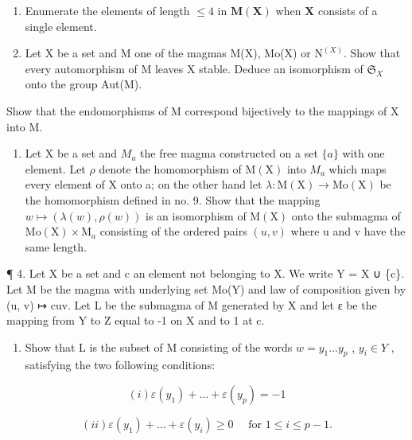 \BourbakiExercisesSection

\begin{enumerate}
\def\labelenumi{\arabic{enumi}.}
\item
  Enumerate the elements of length \(\leqslant 4\) in \(\mathbf{M}(\mathbf{X})\) when \(\mathbf{X}\) consists of a single element.
\item
  Let X be a set and M one of the magmas M(X), Mo(X) or \(\mathrm{N}^{(X)}\). Show that every automorphism of M leaves X stable. Deduce an isomorphism of \(\mathfrak{S}_{X}\) onto the group Aut(M).
\end{enumerate}

Show that the endomorphisms of M correspond bijectively to the mappings of X into M.

\begin{enumerate}
\def\labelenumi{\arabic{enumi}.}
\setcounter{enumi}{2}
\tightlist
\item
  Let X be a set and \(M_{a}\) the free magma constructed on a set \(\{a\}\) with one element. Let \(\rho\) denote the homomorphism of \(\mathrm{M}(\mathrm{X})\) into \(M_{a}\) which maps every element of X onto a; on the other hand let \(\lambda: \mathrm{M}(\mathrm{X}) \to \mathrm{Mo}(\mathrm{X})\) be the homomorphism defined in no. 9. Show that the mapping \(w \mapsto (\lambda(w), \rho(w))\) is an isomorphism of \(\mathrm{M}(\mathrm{X})\) onto the submagma of \(\mathrm{Mo}(\mathrm{X}) \times \mathrm{M}_{a}\) consisting of the ordered pairs \((u, v)\) where u and v have the same length.
\end{enumerate}

¶ 4. Let X be a set and c an element not belonging to X. We write Y = X ∪ \{c\}. Let M be the magma with underlying set Mo(Y) and law of composition given by (u, v) ↦ cuv. Let L be the submagma of M generated by X and let ε be the mapping from Y to Z equal to -1 on X and to 1 at c.

\begin{enumerate}
\def\labelenumi{(\alph{enumi})}
\tightlist
\item
  Show that L is the subset of M consisting of the words \(w = y_{1} \ldots y_{p}\) , \(y_{i} \in Y\) , satisfying the two following conditions:
\end{enumerate}

\[
(i) \varepsilon (y _ {1}) + \dots + \varepsilon (y _ {p}) = - 1
\]

\[
(ii) \varepsilon \left(y _ {1}\right) + \dots + \varepsilon \left(y _ {i}\right) \geqslant 0 \quad \text { for } 1 \leqslant i \leqslant p - 1.
\]

